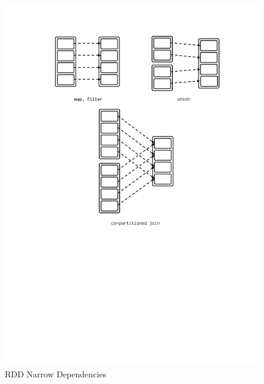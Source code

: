 \begin{itemize}
\begin{figure}[p]
        \includegraphics[clip,trim=4cm 11.5cm 3.1cm 2.5cm]{narrow-dep.pdf}
        \caption[RDD Narrow Dependencies]{RDD Narrow Dependencies}
        \label{fig:sp:narrow-dep}

\end{figure}
\end{itemize}
